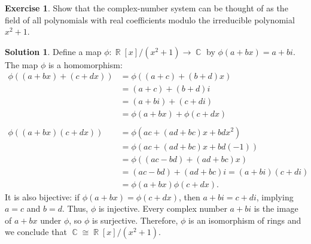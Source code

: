 \documentclass{article}
\theoremstyle{definition}
\newtheorem{exercise}{Exercise}
\newtheorem*{solution}{Solution}
\DeclareMathOperator{\R}{\mathbb{R}}
\DeclareMathOperator{\C}{\mathbb{C}}
\begin{document}
\begin{exercise}
    Show that the complex-number system can be thought of as the field of all polynomials with real coefficients modulo the irreducible polynomial \(x^2+1\).
\end{exercise}
\begin{solution}
    Define a map \(\phi:\R[x]/(x^2+1)\to\C\) by \(\phi(a+bx)=a+bi\). The map \(\phi\) is a homomorphism:
    \begin{align*}
        \phi((a+bx)+(c+dx))&=\phi((a+c)+(b+d)x)\\
        &=(a+c)+(b+d)i \\
        &=(a+bi)+(c+di) \\
        &=\phi(a+bx)+\phi(c+dx) \\
        &\\
        \phi((a+bx)(c+dx))&=\phi(ac+(ad+bc)x+bdx^2) \\
        &=\phi(ac+(ad+bc)x+bd(-1)) \\
        &=\phi((ac-bd)+(ad+bc)x) \\
        &=(ac-bd)+(ad+bc)i=(a+bi)(c+di) \\
        &=\phi(a+bx)\phi(c+dx).
    \end{align*}
    It is also bijective: if \(\phi(a+bx)=\phi(c+dx)\), then \(a+bi=c+di\), implying \(a=c\) and \(b=d\). Thus, \(\phi\) is injective. Every complex number \(a+bi\) is the image of \(a+bx\) under \(\phi\), so \(\phi\) is surjective. Therefore, \(\phi\) is an isomorphism of rings and we conclude that \(\C\cong\R[x]/(x^2+1)\).
\end{solution}
\end{document}
